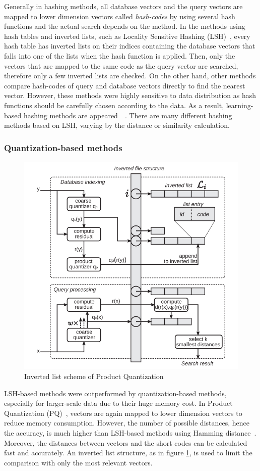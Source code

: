 Generally in hashing methods, all database vectors and the query vectors are mapped to lower dimension vectors called \emph{hash-codes} by using several hash functions and the actual search depends on the method. 
In the methods using hash tables and inverted lists, such as Locality Sensitive Hashing (LSH)~\cite{indyk1998approximate}, every hash table has inverted lists on their indices containing the database vectors that falls into one of the lists when the hash function is applied.
Then, only the vectors that are mapped to the same code as the query vector are searched, therefore only a few inverted lists are checked.
On the other hand, other methods compare hash-codes of query and database vectors directly to find the nearest vector.
However, these methods were highly sensitive to data distribution as hash functions should be carefully chosen according to the data. 
As a result, learning-based hashing methods are appeared~\cite{weiss2009spectral}~\cite{liu2012supervised}.
There are many different hashing methods based on LSH, varying by the distance or similarity calculation.

\subsubsection*{Quantization-based methods}
\label{subsec:related-quantization}

\begin{figure}
    \centering
    \includegraphics[width=.6\textwidth]{thesis/images/pq-fig.png}
    \caption{Inverted list scheme of Product Quantization\cite{jegou2010product}}
    \label{fig:pq}
\end{figure}

LSH-based methods were outperformed by quantization-based methods, especially for larger-scale data due to their huge memory cost.
In Product Quantization (PQ)~\cite{jegou2010product}, vectors are again mapped to lower dimension vectors to reduce memory consumption. 
However, the number of possible distances, hence the accuracy, is much higher than LSH-based methods using Hamming distance~\cite{weiss2009spectral}.
Moreover, the distances between vectors and the short codes can be calculated fast and accurately.
An inverted list structure, as in figure \ref{fig:pq}, is used to limit the comparison with only the most relevant vectors.

